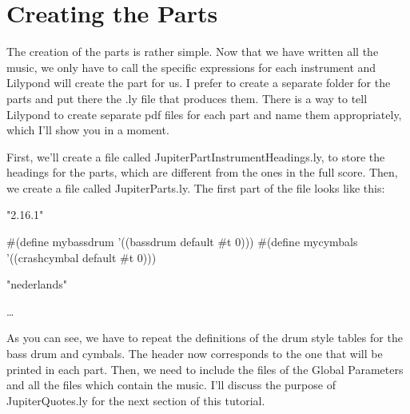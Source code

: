 \documentclass[../../LilyPond-Tutorials]{subfiles}
\begin{document}
\section{Creating the Parts}

The creation of the parts is rather simple.
Now that we have written all the music, we only have to call the specific expressions for each instrument and Lilypond will create the part for us.
I prefer to create a separate folder for the parts and put there the .ly file that produces them.
There is a way to tell Lilypond to create separate pdf files for each part and name them appropriately, which I'll show you in a moment.

First, we'll create a file called JupiterPartInstrumentHeadings.ly, to store the headings for the parts, which are different from the ones in the full score.
Then, we create a file called JupiterParts.ly.
The first part of the file looks like this:

\begin{lilypondcode}
\version "2.16.1"


#(define mybassdrum '((bassdrum default #t 0)))
#(define mycymbals '((crashcymbal default #t 0)))


\language "nederlands"








…



\end{lilypondcode}


As you can see, we have to repeat the definitions of the  drum style tables for the bass drum and cymbals.
The header now corresponds to the one that will be printed in each part.
Then, we need to include the files of the Global Parameters and all the files which contain the music.
I'll discuss the purpose of JupiterQuotes.ly for the next section of this tutorial.
\end{document}
